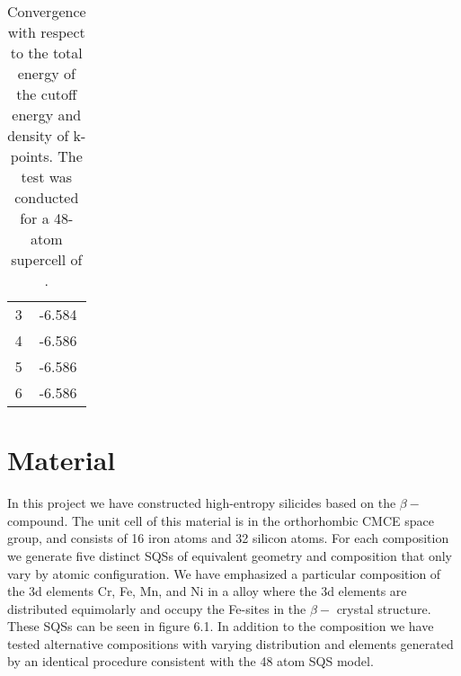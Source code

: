 \begin{table}[H]
\begin{tabular}{@{}cc@{}}
3                                                            & -6.584                                                       \\
4                                                            & -6.586                                                       \\
5                                                            & -6.586                                                       \\
6                                                            & -6.586                                                       \\ \bottomrule
\end{tabular}
\caption{Convergence with respect to the total energy of the cutoff energy and density of k-points. The test was conducted for a 48-atom supercell of .}
\end{table}


\section{Material}
In this project we have constructed high-entropy silicides based on the $\beta-$  compound. The unit cell of this material is in the orthorhombic CMCE space group, and consists of 16 iron atoms and 32 silicon atoms. For each composition we generate five distinct SQSs of equivalent geometry and composition that only vary by atomic configuration. We have emphasized a particular composition of the 3d elements Cr, Fe, Mn, and Ni in a  alloy where the 3d elements are distributed equimolarly and occupy the Fe-sites in the $\beta-$  crystal structure. These SQSs can be seen in figure 6.1. In addition to the  composition we have tested alternative compositions with varying distribution and elements generated by an identical procedure consistent with the 48 atom SQS model.

